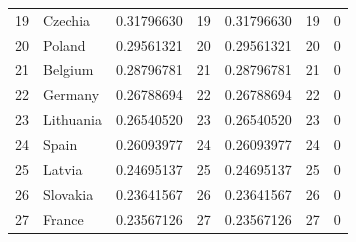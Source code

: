 \begin{longtable}{@{}rlS[table-format=1.8]rS[table-format=1.8]rr@{}}
  19 & Czechia & 0.31796630 & 19 & 0.31796630 & 19 & 0 \\
  20 & Poland & 0.29561321 & 20 & 0.29561321 & 20 & 0 \\
  21 & Belgium & 0.28796781 & 21 & 0.28796781 & 21 & 0 \\
  22 & Germany & 0.26788694 & 22 & 0.26788694 & 22 & 0 \\
  23 & Lithuania & 0.26540520 & 23 & 0.26540520 & 23 & 0 \\
  24 & Spain & 0.26093977 & 24 & 0.26093977 & 24 & 0 \\
  25 & Latvia & 0.24695137 & 25 & 0.24695137 & 25 & 0 \\
  26 & Slovakia & 0.23641567 & 26 & 0.23641567 & 26 & 0 \\
  27 & France & 0.23567126 & 27 & 0.23567126 & 27 & 0 \\
\end{longtable}